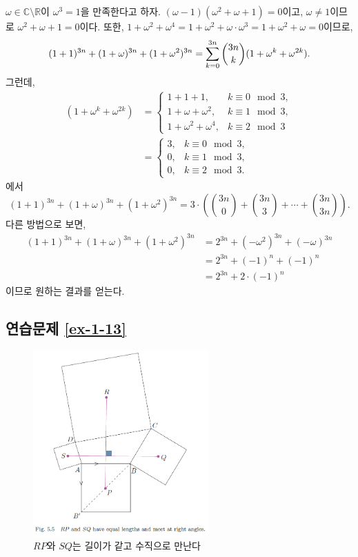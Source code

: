 $\omega\in\mathbb C\setminus \mathbb R$이 $\omega^3=1$을 만족한다고 하자.
$(\omega-1)(\omega^2+\omega+1)=0$이고,
$\omega\ne1$이므로 $\omega^2+\omega+1=0$이다.
또한, $1+\omega^2+\omega^4 = 1+ \omega^2 + \omega\cdot\omega^3 =
1+ \omega^2 + \omega = 0$이므로,
\[
(1+1)^{3n} + (1+\omega)^{3n} + (1+\omega^2)^{3n}
= \sum\limits_{k=0}^{3n} {3n \choose k} (1+\omega^k + \omega^{2k}).
\]
그런데,
\begin{align*}
(1+\omega^k + \omega^{2k})
&= \begin{cases}
1+1+1, & k\equiv 0 \mod 3, \\
1+\omega + \omega^2, & k\equiv 1 \mod 3, \\
1+\omega^2 + \omega^4,& k\equiv 2 \mod 3
\end{cases} \\
&=\begin{cases}
3, & k\equiv 0 \mod 3, \\
0, & k\equiv 1 \mod 3, \\
0, & k\equiv 2 \mod 3.
\end{cases}
\end{align*}
에서
\[
(1+1)^{3n} + (1+\omega)^{3n} + (1+\omega^2)^{3n}
= 3\cdot \left(
{3n \choose 0} + {3n \choose 3} + \cdots + {3n \choose 3n} \right).
\]
다른 방법으로 보면,
\begin{align*}
(1+1)^{3n} + (1+\omega)^{3n} + (1+\omega^2)^{3n}
&= 2^{3n} + (-\omega^2)^{3n} +  (-\omega)^{3n} \\
&= 2^{3n} + (-1)^n + (-1)^n \\
&= 2^{3n} + 2\cdot(-1)^n
\end{align*}
이므로 원하는 결과를 얻는다.

\subsection*{연습문제 \ref{ex-1-13}}

\begin{figure}[h!]
\begin{center}
\includegraphics[width=0.6\textwidth]{./figs/fig-5-5}
\end{center}
\caption{$RP$와 $SQ$는 길이가 같고 수직으로 만난다}
\label{fig-5-5}
\end{figure}

